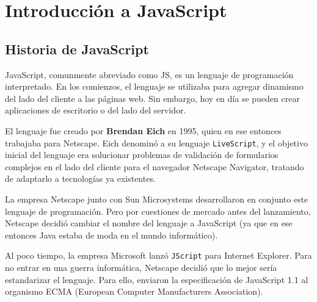 
\chapter{Introducción a JavaScript} %

\label{Chapter1} %


\newcommand{\keyword}[1]{\textbf{#1}}
\newcommand{\tabhead}[1]{\textbf{#1}}
\newcommand{\code}[1]{\texttt{#1}}
\newcommand{\file}[1]{\texttt{\bfseries#1}}
\newcommand{\option}[1]{\texttt{\itshape#1}}
\newcommand{\nuevo}[1]{\fcolorbox{red}{white}{%
    \minipage[t]{\linewidth\fboxsep\fboxrule\relax}
        #1
    \endminipage}}


\section{Historia de JavaScript}

JavaScript, comunmente abreviado como \textsc{JS}, es un lenguaje de programación interpretado. En los comienzos, el lenguaje se utilizaba para agregar dinamismo del lado del cliente a las páginas web. Sin embargo, hoy en día se pueden crear aplicaciones de escritorio o del lado del servidor.

El lenguaje fue creado por \textbf{Brendan Eich} en 1995, quien en ese entonces trabajaba para Netscape. Eich denominó a su lenguaje \texttt{LiveScript}, y el objetivo inicial del lenguaje era solucionar problemas de validación de formularios complejos en el lado del cliente para el navegador Netscape Navigator, tratando de adaptarlo a tecnologías ya existentes. 

La empresa Netscape junto con Sun Microsystems desarrollaron en conjunto este lenguaje de programación. Pero por cuestiones de mercado antes del lanzamiento, Netscape decidió cambiar el nombre del lenguaje a JavaScript (ya que en ese entonces Java estaba de moda en el mundo informático).

Al poco tiempo, la empresa Microsoft lanzó \texttt{JScript} para Internet Explorer. Para no entrar en una guerra informática, Netscape decidió que lo mejor sería estandarizar el lenguaje. Para ello, enviaron la especificación de JavaScript 1.1 al organismo ECMA (European Computer Manufacturers Association).

